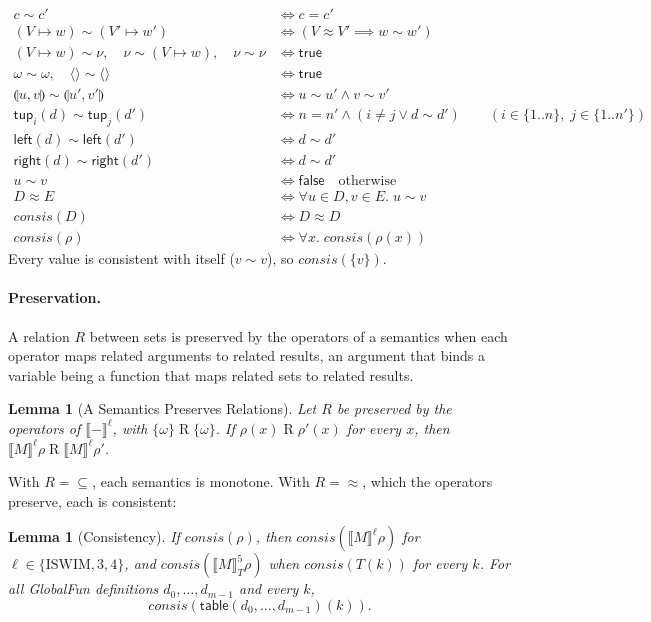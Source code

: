 \documentclass[10pt]{article}
\theoremstyle{acmplain}
\newtheorem{lemma}[theorem]{Lemma}
\newcommand{\SEM}[1]{\llbracket #1 \rrbracket}
\newcommand{\key}[1]{\mathsf{#1}}
\newcommand{\pairv}[2]{\llparenthesis #1, #2 \rrparenthesis}
\newcommand{\tup}[2]{\key{tup}_{#1}(#2)}
\newcommand{\Left}[1]{\key{left}(#1)}
\newcommand{\Right}[1]{\key{right}(#1)}
\newcommand{\emptytup}{\langle\rangle}
\newcommand{\consis}{\mathit{consis}}
\begin{document}
\begin{align*}
  c \sim c' &\iff c = c' \\
  (V \mapsto w) \sim (V' \mapsto w') &\iff (V \approx V' \implies w \sim w') \\
  (V \mapsto w) \sim \nu, \quad \nu \sim (V \mapsto w), \quad \nu \sim \nu &\iff \mathsf{true} \\
  \omega \sim \omega, \quad \emptytup \sim \emptytup &\iff \mathsf{true} \\
  \pairv{u}{v} \sim \pairv{u'}{v'} &\iff u \sim u' \land v \sim v' \\
  \tup{i}{d} \sim \tup{j}{d'} &\iff n = n' \land (i \neq j \lor d \sim d')
     \qquad (i \in \{1..n\},\; j \in \{1..n'\}) \\
  \Left{d} \sim \Left{d'} &\iff d \sim d' \\
  \Right{d} \sim \Right{d'} &\iff d \sim d' \\
  u \sim v &\iff \mathsf{false} \quad \text{otherwise} \\[1ex]
  D \approx E &\iff \forall u \in D, v \in E.\; u \sim v \\
  \consis(D) &\iff D \approx D \\
  \consis(\rho) &\iff \forall x.\; \consis(\rho(x))
\end{align*}
Every value is consistent with itself ($v \sim v$), so $\consis(\{v\})$.

\paragraph{Preservation.}
A relation $R$ between sets is preserved by the operators of a semantics
when each operator maps related arguments to related results, an
argument that binds a variable being a function that maps related sets
to related results.

\begin{lemma}[A Semantics Preserves Relations]\label{lem:pres}
Let $R$ be preserved by the operators of $\SEM{-}^{\ell}$, with
$\{\omega\} \mathrel{R} \{\omega\}$. If $\rho(x) \mathrel{R} \rho'(x)$ for
every $x$, then $\SEM{M}^{\ell}\rho \mathrel{R} \SEM{M}^{\ell}\rho'$.
\end{lemma}
With $R = {\subseteq}$, each semantics is monotone. With $R = {\approx}$,
which the operators preserve, each is consistent:
\begin{lemma}[Consistency]\label{lem:con}
If $\consis(\rho)$, then $\consis(\SEM{M}^{\ell}\rho)$ for
$\ell \in \{\mathrm{ISWIM}, 3, 4\}$, and $\consis(\SEM{M}^{\mathrm{5}}_T\rho)$
when $\consis(T(k))$ for every $k$. For all GlobalFun definitions
$d_0, \ldots, d_{m-1}$ and every $k$,
\[
  \consis(\key{table}(d_0, \ldots, d_{m-1})(k)) .
\]
\end{lemma}
\end{document}
